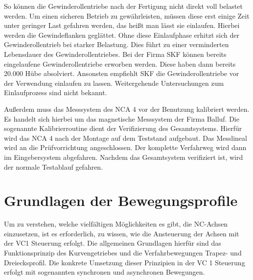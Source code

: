 So können die Gewinderollentriebe nach der Fertigung nicht direkt voll belastet werden. Um einen sicheren Betrieb zu gewährleisten, müssen diese erst einige Zeit unter geringer Last gefahren werden, das heißt man lässt sie einlaufen. Hierbei werden die Gewindeflanken geglättet. Ohne diese Einlaufphase erhitzt sich der Gewinderollentrieb bei starker Belastung. Dies führt zu einer verminderten Lebensdauer des Gewinderollentriebes. Bei der Firma SKF  können bereits eingelaufene Gewinderollentriebe erworben werden. Diese haben dann bereits 20.000 Hübe absolviert. \cite{SKFGroup2014} Ansonsten empfiehlt SKF die Gewinderollentriebe vor der Verwendung einlaufen zu lassen.  Weitergehende Untersuchungen zum Einlaufprozess sind nicht bekannt.




Außerdem muss das Messsystem des NCA 4 vor der Benutzung kalibriert werden. Es handelt sich hierbei um das magnetische Messsystem der Firma Balluf. \cite{BalluffConfigurationtool} Die sogenannte Kalibrierroutine dient der Verifizierung des Gesamtsystems. Hierfür wird das NCA 4 nach der Montage auf dem Teststand aufgebaut. Das Messlineal wird an die Prüfvorrichtung angeschlossen. Der komplette Verfahrweg wird dann im Eingebersystem abgefahren. Nachdem das Gesamtsystem verifiziert ist, wird der normale Testablauf gefahren.






\section{Grundlagen der Bewegungsprofile}\label{cha:Steuerung_der_Achsen}


Um zu verstehen, welche vielfältigen Möglichkeiten es gibt, die NC-Achsen einzusetzen, ist es erforderlich, zu wissen,  wie die Ansteuerung der Achsen mit der \gls{VC1} Steuerung erfolgt. Die allgemeinen Grundlagen hierfür sind das Funktionsprinzip des Kurvengetriebes und die Verfahrbewegungen Trapez- und Dreiecksprofil. Die konkrete Umsetzung dieser Prinzipien in der VC 1 Steuerung erfolgt mit sogenannten synchronen und asynchronen Bewegungen.




